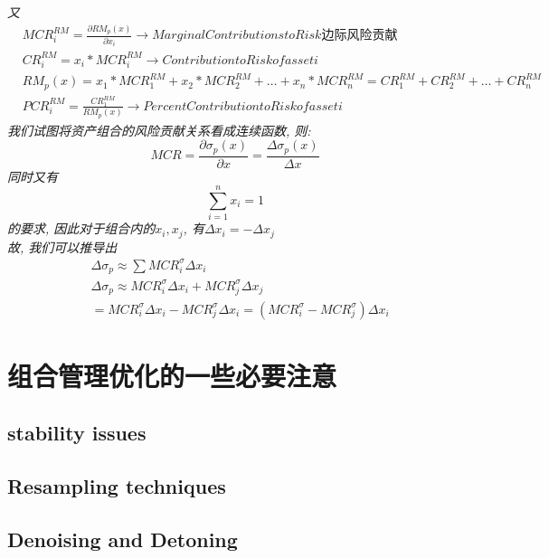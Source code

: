 \documentclass{scrartcl}
\numberwithin{equation}{section}   %
\begin{document}
\textsl{又}
\begin{equation}
    \begin{aligned}
         & MCR_i^{RM} = \frac{\partial RM_p(x)}{\partial x_i} \rightarrow Marginal Contributions to Risk 边际风险贡献            \\
         & CR_i^{RM} = x_i * MCR_i^{RM} \rightarrow Contribution to Risk of asset i                                              \\
         & RM_p(x) = x_1 * MCR_1^{RM} + x_2 * MCR_2^{RM} + \dots +  x_n * MCR_n^{RM} = CR_1^{RM} + CR_2^{RM} + \dots + CR_n^{RM} \\
         & PCR_i^{RM} = \frac{CR_1^{RM}}{RM_{p}(x)} \rightarrow Percent Contribution to Risk of asset i
    \end{aligned}
\end{equation}
\textsl{我们试图将资产组合的风险贡献关系看成连续函数, 则: $$MCR =  \frac{\partial \sigma_p(x)}{\partial x}
    = \frac{\Delta \sigma_p(x)}{\Delta x} $$同时又有 $$\sum_{i=1}^n{x_i} = 1$$的要求, 因此对于组合内的$x_i, x_j$, 有$\Delta{x_i} = - \Delta {x_j}$
\\ 故, 我们可以推导出}
\begin{equation}
    \begin{aligned}
         & \Delta{\sigma_p} \approx \sum MCR_i^{\sigma} \Delta x_i                                                   \\
         & \Delta {\sigma_p} \approx MCR_i^{\sigma} \Delta x_i +   MCR_j^{\sigma} \Delta x_j                         \\
         & = MCR_i^{\sigma} \Delta x_i -   MCR_j^{\sigma} \Delta x_i = (MCR_i^{\sigma} -  MCR_j^{\sigma}) \Delta x_i
    \end{aligned}
\end{equation}


\newpage

\section{组合管理优化的一些必要注意}
\subsection{stability issues}
\subsection{Resampling techniques}
\subsection{Denoising and Detoning}
\end{document}
